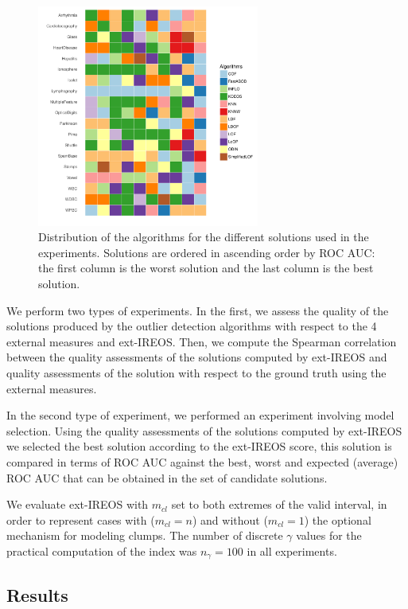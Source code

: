 \begin{figure}[ht!]
\center
\includegraphics[width=0.65\textwidth]{figs/algorithms.pdf}
\captionsetup{justification=centering}
\caption{Distribution of the algorithms for the different solutions used in the experiments. Solutions are ordered in ascending order by ROC AUC: the first column is the worst solution and the last column is the best solution.}
\label{fig:algorithms}
\end{figure}

We perform two types of experiments. In the first, we assess the quality of the solutions produced by the outlier detection algorithms with respect to the 4 external measures and ext-IREOS. Then, we compute the Spearman correlation between the quality assessments of the solutions computed by ext-IREOS and quality assessments of the solution with respect to the ground truth using the external measures.

In the second type of experiment, we performed an experiment involving model selection. Using the quality assessments of the solutions computed by ext-IREOS we selected the best solution according to the ext-IREOS score, this solution is compared in terms of ROC AUC against the best, worst and expected (average) ROC AUC that can be obtained in the set of candidate solutions.

We evaluate ext-IREOS with $m_{cl}$ set to both extremes of the valid interval, in order to represent cases with ($m_{cl} = n$) and without ($m_{cl} = 1$) the optional mechanism for modeling clumps.
The number of discrete $\gamma$ values for the practical computation of the index was $n_{\gamma} = 100$ in all experiments.

\subsection{Results}

